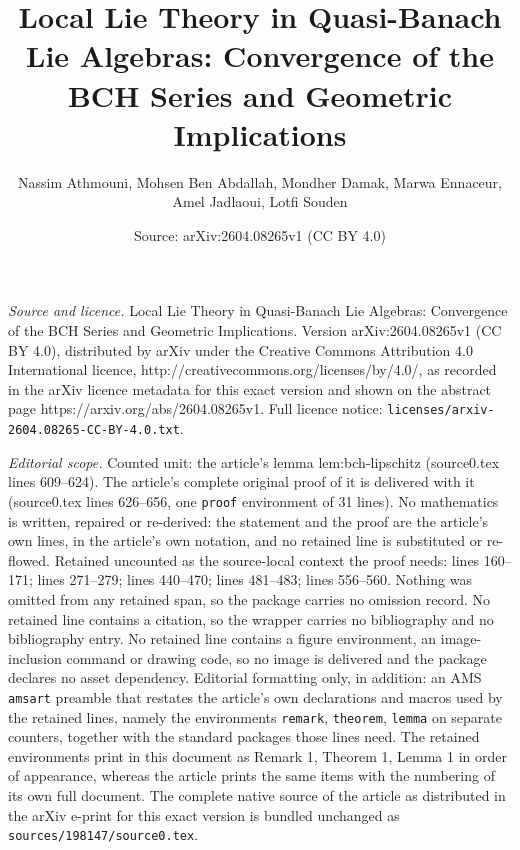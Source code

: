 \documentclass[10pt,a4paper]{amsart}
\title{Local Lie Theory in Quasi-Banach Lie Algebras: Convergence of the BCH Series and Geometric Implications}
\author{Nassim Athmouni, Mohsen Ben Abdallah, Mondher Damak, Marwa Ennaceur, Amel Jadlaoui, Lotfi Souden}
\date{Source: arXiv:2604.08265v1 (CC BY 4.0)}
\begin{document}
\maketitle

\noindent\emph{Source and licence.} Local Lie Theory in Quasi-Banach Lie Algebras: Convergence of the BCH Series and Geometric Implications. Version arXiv:2604.08265v1 (CC BY 4.0), distributed by arXiv under the Creative Commons Attribution 4.0 International licence, http://creativecommons.org/licenses/by/4.0/, as recorded in the arXiv licence metadata for this exact version and shown on the abstract page https://arxiv.org/abs/2604.08265v1. Full licence notice: \texttt{licenses/arxiv-2604.08265-CC-BY-4.0.txt}.\par\smallskip

\noindent\textit{Editorial scope.} Counted unit: the article's lemma lem:bch-lipschitz (source0.tex lines 609--624). The article's complete original proof of it is delivered with it (source0.tex lines 626--656, one \texttt{proof} environment of 31 lines). No mathematics is written, repaired or re-derived: the statement and the proof are the article's own lines, in the article's own notation, and no retained line is substituted or re-flowed.  Retained uncounted as the source-local context the proof needs: lines 160--171; lines 271--279; lines 440--470; lines 481--483; lines 556--560.  Nothing was omitted from any retained span, so the package carries no omission record.  No retained line contains a citation, so the wrapper carries no bibliography and no bibliography entry.  No retained line contains a figure environment, an image-inclusion command or drawing code, so no image is delivered and the package declares no asset dependency.  Editorial formatting only, in addition: an AMS \texttt{amsart} preamble that restates the article's own declarations and macros used by the retained lines, namely the environments \texttt{remark}, \texttt{theorem}, \texttt{lemma} on separate counters, together with the standard packages those lines need.  The retained environments print in this document as Remark 1, Theorem 1, Lemma 1 in order of appearance, whereas the article prints the same items with the numbering of its own full document.  The complete native source of the article as distributed in the arXiv e-print for this exact version is bundled unchanged as \texttt{sources/198147/source0.tex}.
\end{document}
